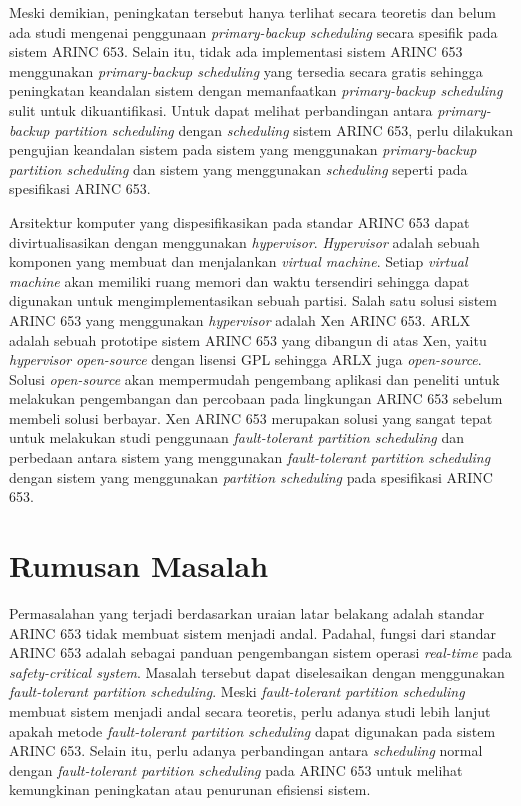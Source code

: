 Meski demikian, peningkatan tersebut hanya terlihat secara teoretis dan belum ada studi mengenai
penggunaan \textit{primary-backup scheduling} secara spesifik pada sistem ARINC 653. Selain itu,
tidak ada implementasi sistem ARINC 653 menggunakan \textit{primary-backup scheduling} yang
tersedia secara gratis sehingga peningkatan keandalan sistem dengan memanfaatkan
\textit{primary-backup scheduling} sulit untuk dikuantifikasi. Untuk dapat melihat perbandingan
antara \textit{primary-backup partition scheduling} dengan \textit{scheduling} sistem ARINC 653,
perlu dilakukan pengujian keandalan sistem pada sistem yang menggunakan \textit{primary-backup
partition scheduling} dan sistem yang menggunakan \textit{scheduling} seperti pada spesifikasi
ARINC 653.

Arsitektur komputer yang dispesifikasikan pada standar ARINC 653 dapat divirtualisasikan dengan
menggunakan \textit{hypervisor}. \textit{Hypervisor} adalah sebuah komponen yang membuat dan
menjalankan \textit{virtual machine}.  Setiap \textit{virtual machine} akan memiliki ruang
memori dan waktu tersendiri sehingga dapat digunakan untuk mengimplementasikan sebuah partisi.
Salah satu solusi sistem ARINC 653 yang menggunakan \textit{hypervisor} adalah Xen ARINC 653.
ARLX adalah sebuah prototipe sistem ARINC 653 yang dibangun di atas Xen, yaitu
\textit{hypervisor} \textit{open-source} dengan lisensi GPL sehingga ARLX juga
\textit{open-source}.  Solusi \textit{open-source} akan mempermudah pengembang aplikasi dan
peneliti untuk melakukan pengembangan dan percobaan pada lingkungan ARINC 653 sebelum membeli
solusi berbayar. Xen ARINC 653 merupakan solusi yang sangat tepat untuk melakukan studi
penggunaan \textit{fault-tolerant partition scheduling} dan perbedaan antara sistem yang
menggunakan \textit{fault-tolerant partition scheduling} dengan sistem yang menggunakan
\textit{partition scheduling} pada spesifikasi ARINC 653.

\section{Rumusan Masalah}

Permasalahan yang terjadi berdasarkan uraian latar belakang adalah standar ARINC 653 tidak
membuat sistem menjadi andal. Padahal, fungsi dari standar ARINC 653 adalah sebagai panduan
pengembangan sistem operasi \textit{real-time} pada \textit{safety-critical system}.  Masalah
tersebut dapat diselesaikan dengan menggunakan \textit{fault-tolerant partition scheduling}.
Meski \textit{fault-tolerant partition scheduling} membuat sistem menjadi andal secara teoretis,
perlu adanya studi lebih lanjut apakah metode \textit{fault-tolerant partition scheduling} dapat
digunakan pada sistem ARINC 653. Selain itu, perlu adanya perbandingan antara
\textit{scheduling} normal dengan \textit{fault-tolerant partition scheduling} pada ARINC 653
untuk melihat kemungkinan peningkatan atau penurunan efisiensi sistem.

